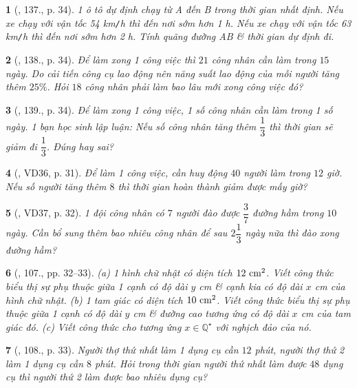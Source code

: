 \documentclass{article}
\newtheorem{baitoan}{}
\begin{document}
\begin{baitoan}[\cite{Tuyen_Toan_7}, 137., p. 34]
	1 ô tô dự định chạy từ A đến B trong thời gian nhất định. Nếu xe chạy với vận tốc {\rm54 km{\tt/}h} thì đến nơi sớm hơn {\rm1 h}. Nếu xe chạy với vận tốc {\rm63 km{\tt/}h} thì đến nơi sớm hơn {\rm2 h}. Tính quãng đường AB \& thời gian dự định đi.
\end{baitoan}

\begin{baitoan}[\cite{Tuyen_Toan_7}, 138., p. 34]
	Để làm xong 1 công việc thì $21$ công nhân cần làm trong $15$ ngày. Do cải tiến công cụ lao động nên năng suất lao động của mỗi người tăng thêm $25\%$. Hỏi $18$ công nhân phải làm bao lâu mới xong công việc đó?
\end{baitoan}

\begin{baitoan}[\cite{Tuyen_Toan_7}, 139., p. 34]
	Để làm xong 1 công việc, 1 số công nhân cần làm trong 1 số ngày. 1 bạn học sinh lập luận: Nếu số công nhân tăng thêm $\dfrac{1}{3}$ thì thời gian sẽ giảm đi $\dfrac{1}{3}$. Đúng hay sai?
\end{baitoan}

\begin{baitoan}[\cite{Binh_Toan_7_tap_1}, VD36, p. 31]
	Để làm 1 công việc, cần huy động $40$ người làm trong $12$ giờ. Nếu số người tăng thêm $8$ thì thời gian hoàn thành giảm được mấy giờ?
\end{baitoan}

\begin{baitoan}[\cite{Binh_Toan_7_tap_1}, VD37, p. 32]
	1 đội công nhân có $7$ người đào được $\dfrac{3}{7}$ đường hầm trong $10$ ngày. Cần bổ sung thêm bao nhiêu công nhân để sau $2\dfrac{1}{3}$ ngày nữa thì đào xong đường hầm?
\end{baitoan}

\begin{baitoan}[\cite{Binh_Toan_7_tap_1}, 107., pp. 32--33]
	(a) 1 hình chữ nhật có diện tích $\rm12\ cm^2$. Viết công thức biểu thị sự phụ thuộc giữa 1 cạnh có độ dài $y$ {\rm cm} \& cạnh kia có độ dài $x$ {\rm cm} của hình chữ nhật. (b) 1 tam giác có diện tích $\rm10\ cm^2$. Viết công thức biểu thị sự phụ thuộc giữa 1 cạnh có độ dài $y$ {\rm cm} \& đường cao tương ứng có độ dài $x$ {\rm cm} của tam giác đó. (c) Viết công thức cho tương ứng $x\in\mathbb{Q}^\star$ với nghịch đảo của nó.
\end{baitoan}

\begin{baitoan}[\cite{Binh_Toan_7_tap_1}, 108., p. 33]
	Người thợ thứ nhất làm 1 dụng cụ cần $12$ phút, người thợ thứ 2 làm 1 dụng cụ cần $8$ phút. Hỏi trong thời gian người thứ nhất làm được $48$ dụng cụ thì người thứ 2 làm được bao nhiêu dụng cụ?
\end{baitoan}
\end{document}
